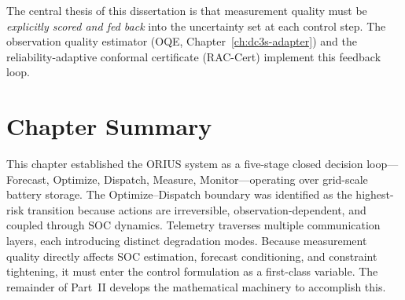 The central thesis of this dissertation is that measurement quality must be
\emph{explicitly scored and fed back} into the uncertainty set at each control
step.  The observation quality estimator (OQE, Chapter~\ref{ch:dc3s-adapter})
and the reliability-adaptive conformal certificate (RAC-Cert) implement this
feedback loop.

\section{Chapter Summary}

This chapter established the ORIUS system as a five-stage closed decision
loop---Forecast, Optimize, Dispatch, Measure, Monitor---operating over
grid-scale battery storage.  The Optimize--Dispatch boundary was identified as
the highest-risk transition because actions are irreversible, observation-dependent,
and coupled through SOC dynamics.  Telemetry traverses multiple communication
layers, each introducing distinct degradation modes.  Because measurement
quality directly affects SOC estimation, forecast conditioning, and constraint
tightening, it must enter the control formulation as a first-class variable.
The remainder of Part~II develops the mathematical machinery to accomplish this.
